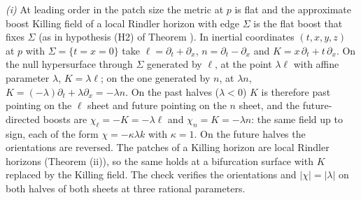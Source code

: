 \emph{(i)} At leading order in the patch size the metric at $p$ is flat and the approximate boost Killing field of a local Rindler horizon with edge $\Sigma$ is the flat boost that fixes $\Sigma$ (as in hypothesis (H2) of Theorem ). In inertial coordinates $(t, x, y, z)$ at $p$ with $\Sigma = \{t = x = 0\}$ take $\ell = \partial_{t} + \partial_{x}$, $n = \partial_{t} - \partial_{x}$ and $K = x\,\partial_{t} + t\,\partial_{x}$. On the null hypersurface through $\Sigma$ generated by $\ell$, at the point $\lambda\ell$ with affine parameter $\lambda$, $K = \lambda\ell$; on the one generated by $n$, at $\lambda n$, $K = (-\lambda)\partial_{t} + \lambda\partial_{x} = -\lambda n$. On the past halves ($\lambda < 0$) $K$ is therefore past pointing on the $\ell$ sheet and future pointing on the $n$ sheet, and the future-directed boosts are $\chi_{\ell} = -K = -\lambda\ell$ and $\chi_{n} = K = -\lambda n$: the same field up to sign, each of the form $\chi = -\kappa\lambda k$ with $\kappa = 1$. On the future halves the orientations are reversed. The patches of a Killing horizon are local Rindler horizons (Theorem (ii)), so the same holds at a bifurcation surface with $K$ replaced by the Killing field. The check verifies the orientations and $|\chi| = |\lambda|$ on both halves of both sheets at three rational parameters.

